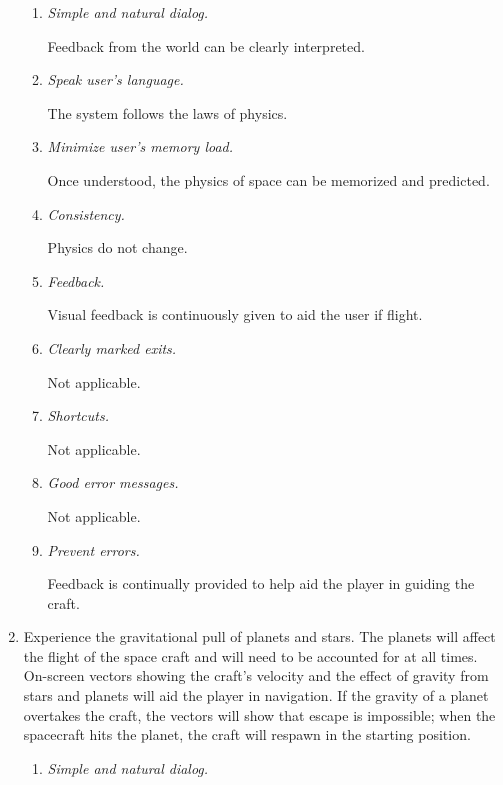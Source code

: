 \begin{enumerate}
\begin{enumerate}
  \item \emph{Simple and natural dialog.}

  Feedback from the world can be clearly interpreted.
  
  \item \emph{Speak user's language.}

  The system follows the laws of physics.
  
  \item \emph{Minimize user's memory load.}

  Once understood, the physics of space can be memorized and predicted.
  
  \item \emph{Consistency.}

  Physics do not change.
  
  \item \emph{Feedback.}

  Visual feedback is continuously given to aid the user if flight.
  
  \item \emph{Clearly marked exits.}

  Not applicable.
  
  \item \emph{Shortcuts.}

  Not applicable.
  
  \item \emph{Good error messages.}
  
  Not applicable.

  \item \emph{Prevent errors.}
 
  Feedback is continually provided to help aid the player in guiding the craft.

\end{enumerate}

  \item Experience the gravitational pull of planets and stars.  The planets will affect the flight of the space craft and will need to be accounted for at all times.  On-screen vectors showing the craft's velocity and the effect of gravity from stars and planets will aid the player in navigation.  If the gravity of a planet overtakes the craft, the vectors will show that escape is impossible; when the spacecraft hits the planet, the craft will respawn in the starting position.
\begin{enumerate}
  
  \item \emph{Simple and natural dialog.}


\end{enumerate}
\end{enumerate}
